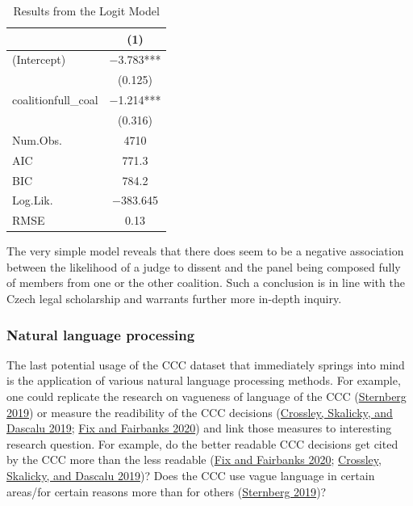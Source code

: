 \documentclass[
  11pt,
]{article}
\begin{document}
\begin{table}
\centering
\caption{\label{tab:coalitions}Results from the Logit Model}
\centering
\begin{tabular}[t]{lc}
\toprule
  & (1)\\
\midrule
(Intercept) & \num{-3.783}***\\
 & (\num{0.125})\\
coalitionfull\_coal & \num{-1.214}***\\
 & (\num{0.316})\\
\midrule
Num.Obs. & \num{4710}\\
AIC & \num{771.3}\\
BIC & \num{784.2}\\
Log.Lik. & \num{-383.645}\\
RMSE & \num{0.13}\\
\bottomrule
\end{tabular}
\end{table}

The very simple model reveals that there does seem to be a negative
association between the likelihood of a judge to dissent and the panel
being composed fully of members from one or the other coalition. Such a
conclusion is in line with the Czech legal scholarship and warrants
further more in-depth inquiry.

\hypertarget{natural-language-processing}{%
\subsubsection{Natural language
processing}\label{natural-language-processing}}

The last potential usage of the CCC dataset that immediately springs
into mind is the application of various natural language processing
methods. For example, one could replicate the research on vagueness of
language of the CCC
(\protect\hyperlink{ref-sternbergNoPublicNo2019}{Sternberg 2019}) or
measure the readibility of the CCC decisions
(\protect\hyperlink{ref-crossleyMovingClassicReadability2019}{Crossley,
Skalicky, and Dascalu 2019};
\protect\hyperlink{ref-fixEffectOpinionReadability2020}{Fix and
Fairbanks 2020}) and link those measures to interesting research
question. For example, do the better readable CCC decisions get cited by
the CCC more than the less readable
(\protect\hyperlink{ref-fixEffectOpinionReadability2020}{Fix and
Fairbanks 2020};
\protect\hyperlink{ref-crossleyMovingClassicReadability2019}{Crossley,
Skalicky, and Dascalu 2019})? Does the CCC use vague language in certain
areas/for certain reasons more than for others
(\protect\hyperlink{ref-sternbergNoPublicNo2019}{Sternberg 2019})?
\end{document}
